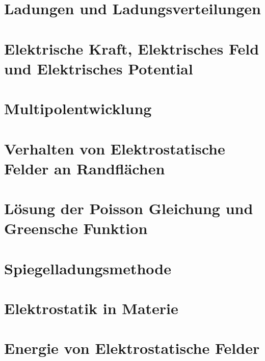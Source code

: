 \section{Ladungen und Ladungsverteilungen}%
\label{sub:Ladungen-und-Ladungsverteilungen}


\newpage
\section{Elektrische Kraft, Elektrisches Feld und Elektrisches Potential}%
\label{sub:Ladungen-und-Ladungsverteilungen}


\newpage
\section{Multipolentwicklung}%
\label{sub:Multipolentwicklung}


\newpage
\section{Verhalten von Elektrostatische Felder an Randflächen}%
\label{sub:randflaechen}


\newpage
\section{Lösung der Poisson Gleichung und Greensche Funktion}%
\label{sub:poisson-green}


\newpage
\section{Spiegelladungsmethode}%

\newpage
\section{Elektrostatik in Materie}%

\newpage
\section{Energie von Elektrostatische Felder}%
